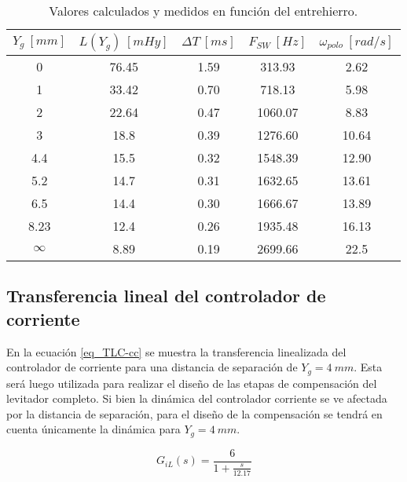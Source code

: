 \begin{table}[H]
	\begin{center}
		\begin{tabular}{| c | c | c | c | c |}
			\hline
			$Y_g\:[mm]$ & $L(Y_g)\:[mHy]$ & $\Delta T\:[ms]$ & $F_{SW}\:[Hz]$ & $\omega _{polo}\:[rad/s]$\\ \hline
			0 & 76.45 & 1.59 & 313.93 & 2.62\\ \hline
			1 & 33.42 & 0.70 & 718.13 & 5.98\\ \hline
			2 & 22.64 &	0.47 & 1060.07 & 8.83\\ \hline
			3 &	18.8 & 0.39 & 1276.60 & 10.64\\ \hline
			4.4 & 15.5 & 0.32 & 1548.39 & 12.90\\ \hline
			5.2 & 14.7 & 0.31 & 1632.65 & 13.61\\ \hline
			6.5 & 14.4 & 0.30 & 1666.67 & 13.89\\ \hline
			8.23 & 12.4 & 0.26 & 1935.48 & 16.13\\ \hline
			$\infty$ & 8.89 & 0.19 & 2699.66 & 22.5	\\ \hline
		\end{tabular}
		\caption{Valores calculados y medidos en función del entrehierro.}
		\label{tab_mediciones}
	\end{center}
\end{table}

\subsection{Transferencia lineal del controlador de corriente}

\noindent En la ecuación \ref{eq_TLC-cc} se muestra la transferencia linealizada del controlador de corriente para una distancia de separación de $Y_g=4\:mm$. Esta será luego utilizada para realizar el diseño de las etapas de compensación del levitador completo. Si bien la dinámica del controlador corriente se ve afectada por la distancia de separación, para el diseño de la compensación se tendrá en cuenta únicamente la dinámica para $Y_g=4\:mm$.

\begin{equation} \label{eq_TLC-cc}
G_{iL}(s) = \frac{6}{1+\frac{s}{12.17}}
\end{equation}
